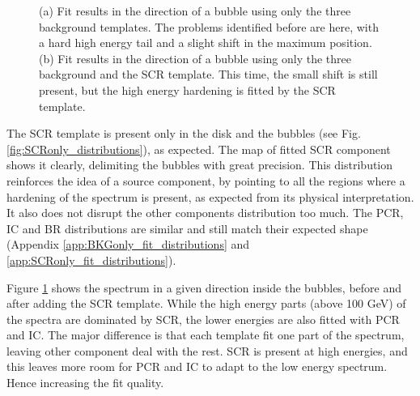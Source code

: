 \begin{figure}[h]
\begin{minipage}[h]{0.45\textwidth}
	  \subcaption{}
	  \label{fig:BKGonly_bubble_spec}
  \end{minipage}	 
  \caption[Spectra before and after adding SCR in a bubble.]{(a) Fit results in the direction of a bubble using only the three background templates. The problems identified before are here, with a hard high energy tail and a slight shift in the maximum position. (b) Fit results in the direction of a bubble using only the three background and the SCR template. This time, the small shift is still present, but the high energy hardening is fitted by the SCR template.}
	  \label{fig:SCRonly_BKGonly_spec_comp}
\end{figure}

The SCR template is present only in the disk and the bubbles (see Fig. \ref{fig:SCRonly_distributions}), as expected. The map of fitted SCR component shows it clearly, delimiting the bubbles with great precision. This distribution reinforces the idea of a source component, by pointing to all the regions where a hardening of the spectrum is present, as expected from its physical interpretation.
It also does not disrupt the other components distribution too much. The PCR, IC and BR distributions are similar and still match their expected shape (Appendix \ref{app:BKGonly_fit_distributions} and \ref{app:SCRonly_fit_distributions}).

Figure \ref{fig:SCRonly_BKGonly_spec_comp} shows the spectrum in a given direction inside the bubbles, before and after adding the SCR template. While the high energy parts (above 100 GeV) of the spectra are dominated by SCR, the lower energies are also fitted with PCR and IC. The major difference is that each template fit one part of the spectrum, leaving other component deal with the rest. SCR is present at high energies, and this leaves more room for PCR and IC to adapt to the low energy spectrum. Hence increasing the fit quality.

